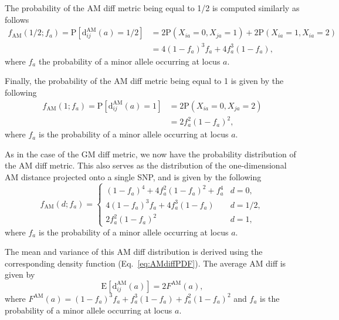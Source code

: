 \documentclass[10pt,letterpaper]{article}
\begin{document}
The probability of the AM diff metric being equal to 1/2 is computed similarly as follows
%
\begin{equation}\label{eq:probAM0.5}
\begin{aligned}
f_\text{AM}\left(1/2;f_a\right) = \text{P}\left[\text{d}^\text{AM}_{ij}(a) = 1/2\right] &= 2\text{P}\left(X_{ia}=0,X_{ja}=1\right) + 2\text{P}\left(X_{ia}=1,X_{ia}=2\right) \\
&= 4 \left(1 - f_a\right)^3 f_a + 4 f^3_a \left(1 - f_a\right),
\end{aligned}
\end{equation}
%
where $f_a$ the probability of a minor allele occurring at locus $a$.

Finally, the probability of the AM diff metric being equal to 1 is given by the following
%
\begin{equation}\label{eq:probAM1}
\begin{aligned}
f_\text{AM}(1;f_a) = \text{P}\left[\text{d}^\text{AM}_{ij}(a) = 1\right] &= 2 \text{P}\left(X_{ia}=0,X_{ja}=2\right) \\
&= 2 f^2_a \left(1 - f_a\right)^2,
\end{aligned}
\end{equation}
%
where $f_a$ is the probability of a minor allele occurring at locus $a$.

As in the case of the GM diff metric, we now have the probability distribution of the AM diff metric. This also serves as the distribution of the one-dimensional AM distance projected onto a single SNP, and is given by the following
%
\begin{equation}\label{eq:AMdiffPDF}
f_\text{AM}(d;f_a) = \begin{cases}
\left(1 - f_a\right)^4 + 4 f^2_a \left(1 - f_a\right)^2 + f^4_a & d=0, \\
4 \left(1 - f_a\right)^3 f_a + 4 f^3_a \left(1 - f_a\right) & d=1/2, \\
2 f^2_a \left(1 - f_a\right)^2 & d=1,
\end{cases}
\end{equation}
%
where $f_a$ is the probability of a minor allele occurring at locus $a$.

The mean and variance of this AM diff distribution is derived using the corresponding density function (Eq.~\ref{eq:AMdiffPDF}). The average AM diff is given by
%
\begin{equation}\label{eq:AMdiffMean}
\text{E}\left[\text{d}^\text{AM}_{ij}(a)\right] = 2 F^\text{AM}(a),
\end{equation}
%
where $F^\text{AM}(a) = \left(1 - f_a\right)^3 f_a + f^3_a \left(1 - f_a\right) + f^2_a \left(1 - f_a\right)^2$ and $f_a$ is the probability of a minor allele occurring at locus $a$.
\end{document}
